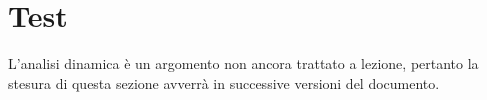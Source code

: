 \documentclass[PianoDiQualifica.tex]{subfiles}
\begin{document}
\section{Test}
 L'analisi dinamica è un argomento non ancora trattato a lezione, pertanto la stesura di questa sezione avverrà in successive versioni del documento. 
\end{document}
